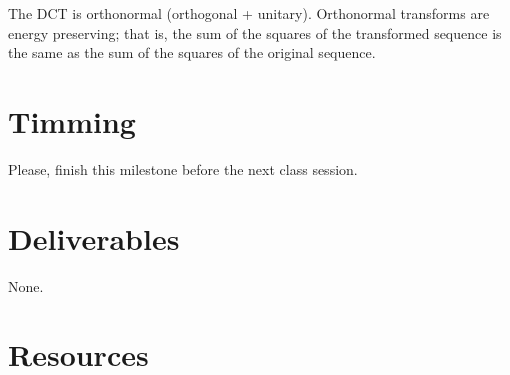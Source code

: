The DCT is orthonormal (orthogonal + unitary). Orthonormal transforms
are energy preserving; that is, the sum of the squares of the
transformed sequence is the same as the sum of the squares of the
original sequence.

\section{Timming}

Please, finish this milestone before the next class session.

\section{Deliverables}

None.

\section{Resources}

\renewcommand{\addcontentsline}[3]{}%

